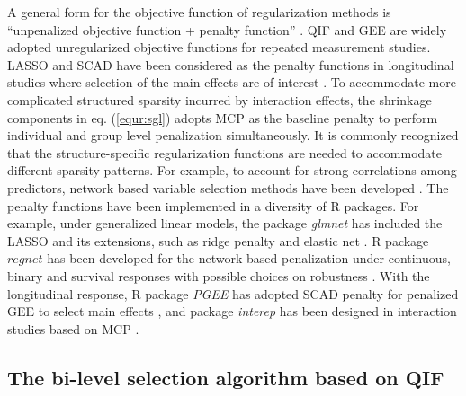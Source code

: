 \documentclass[12pt]{article}
\begin{document}
A general form for the objective function of regularization methods is ``unpenalized objective function + penalty function'' \cite{WuMa2015}. QIF and GEE are widely adopted unregularized objective functions for repeated measurement studies. LASSO and SCAD have been considered as the penalty functions in longitudinal studies where selection of the main effects are of interest \cite{WZQ,MSW,CQ}. To accommodate more complicated structured sparsity incurred by interaction effects, the shrinkage components in eq. (\ref{equr:sgl}) adopts MCP as the baseline penalty to perform individual and group level penalization simultaneously. It is commonly recognized that the structure-specific regularization functions are needed to accommodate different sparsity patterns. For example, to account for strong correlations among predictors, network based variable selection methods have been developed \cite{ren2019robust,huang2021splsn}. The penalty functions have been implemented in a diversity of R packages. For example, under generalized linear models, the package \emph{glmnet} has included the LASSO and its extensions, such as ridge penalty and elastic net \cite{FHT}. R package \href{https://CRAN.R-project.org/package=regnet}{$regnet$} has been developed for the network based penalization under continuous, binary and survival responses with possible choices on robustness \cite{ren2017network,ren2019robust}. With the longitudinal response, R package \emph{PGEE} has adopted SCAD penalty for penalized GEE to select main effects \cite{inan2017pgee}, and package \emph{interep} has been designed in interaction studies based on MCP \cite{zhou2022interep}. 




\subsection{The bi-level selection algorithm based on QIF}\label{sec:3.4}
\end{document}
